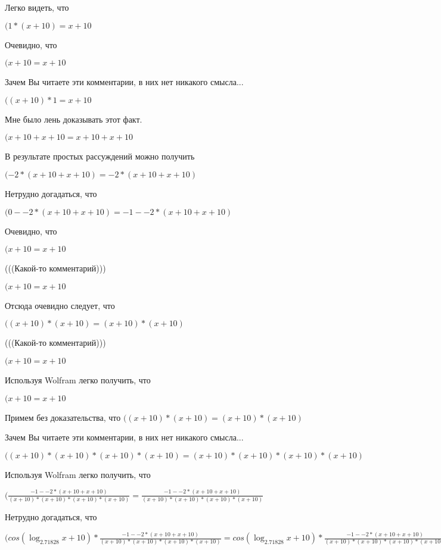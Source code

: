 \documentclass[12pt,a4paper,fleqn]{article}
\theoremstyle{definition}
\begin{document}
Легко видеть, что

$( 1  * ( x  +  10 ) =  x  +  10 $

Очевидно, что

$( x  +  10  =  x  +  10 $

Зачем Вы читаете эти комментарии, в них нет никакого смысла...

$(( x  +  10 ) *  1  =  x  +  10 $

Мне было лень доказывать этот факт.

$( x  +  10  +  x  +  10  =  x  +  10  +  x  +  10 $

В результате простых рассуждений можно получить

$( -2  * ( x  +  10  +  x  +  10 ) =  -2  * ( x  +  10  +  x  +  10 )$

Нетрудно догадаться, что

$( 0  -  -2  * ( x  +  10  +  x  +  10 ) =  -1  -  -2  * ( x  +  10  +  x  +  10 )$

Очевидно, что

$( x  +  10  =  x  +  10 $

(((Какой-то комментарий)))

$( x  +  10  =  x  +  10 $

Отсюда очевидно следует, что

$(( x  +  10 ) * ( x  +  10 ) = ( x  +  10 ) * ( x  +  10 )$

(((Какой-то комментарий)))

$( x  +  10  =  x  +  10 $

Используя Wolfram легко получить, что

$( x  +  10  =  x  +  10 $

Примем без доказательства, что
$(( x  +  10 ) * ( x  +  10 ) = ( x  +  10 ) * ( x  +  10 )$

Зачем Вы читаете эти комментарии, в них нет никакого смысла...

$(( x  +  10 ) * ( x  +  10 ) * ( x  +  10 ) * ( x  +  10 ) = ( x  +  10 ) * ( x  +  10 ) * ( x  +  10 ) * ( x  +  10 )$

Используя Wolfram легко получить, что

$(\frac{ -1  -  -2  * ( x  +  10  +  x  +  10 )}{( x  +  10 ) * ( x  +  10 ) * ( x  +  10 ) * ( x  +  10 )}
 = \frac{ -1  -  -2  * ( x  +  10  +  x  +  10 )}{( x  +  10 ) * ( x  +  10 ) * ( x  +  10 ) * ( x  +  10 )}
$

Нетрудно догадаться, что

$(cos(\log_{ 2.71828 }{ x  +  10 }) * \frac{ -1  -  -2  * ( x  +  10  +  x  +  10 )}{( x  +  10 ) * ( x  +  10 ) * ( x  +  10 ) * ( x  +  10 )}
 = cos(\log_{ 2.71828 }{ x  +  10 }) * \frac{ -1  -  -2  * ( x  +  10  +  x  +  10 )}{( x  +  10 ) * ( x  +  10 ) * ( x  +  10 ) * ( x  +  10 )}
$
\end{document}
